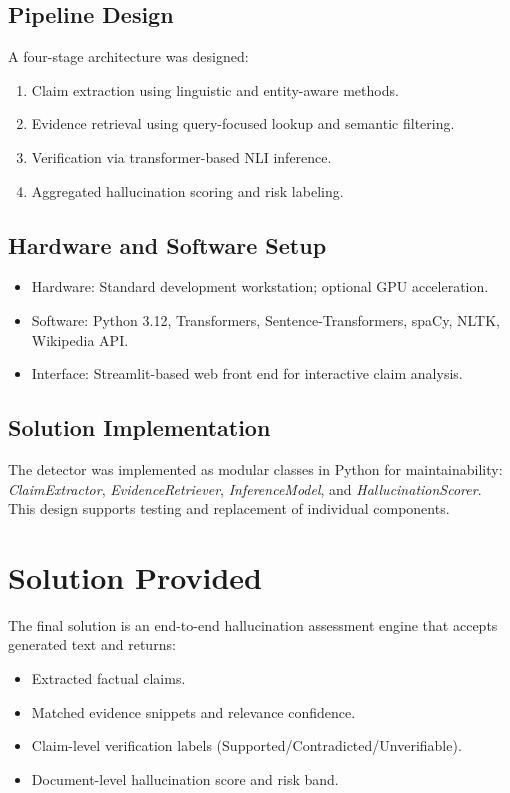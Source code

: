\documentclass[12pt,a4paper]{report}
\begin{document}
\subsection{Pipeline Design}
A four-stage architecture was designed:
\begin{enumerate}[leftmargin=1.5em]
\item Claim extraction using linguistic and entity-aware methods.
\item Evidence retrieval using query-focused lookup and semantic filtering.
\item Verification via transformer-based NLI inference.
\item Aggregated hallucination scoring and risk labeling.
\end{enumerate}

\subsection{Hardware and Software Setup}
\begin{itemize}[leftmargin=1.5em]
\item Hardware: Standard development workstation; optional GPU acceleration.
\item Software: Python 3.12, Transformers, Sentence-Transformers, spaCy, NLTK, Wikipedia API.
\item Interface: Streamlit-based web front end for interactive claim analysis.
\end{itemize}

\subsection{Solution Implementation}
The detector was implemented as modular classes in Python for maintainability:
\textit{ClaimExtractor}, \textit{EvidenceRetriever}, \textit{InferenceModel}, and \textit{HallucinationScorer}.
This design supports testing and replacement of individual components.

\section{Solution Provided}
The final solution is an end-to-end hallucination assessment engine that accepts generated text and returns:
\begin{itemize}[leftmargin=1.5em]
\item Extracted factual claims.
\item Matched evidence snippets and relevance confidence.
\item Claim-level verification labels (Supported/Contradicted/Unverifiable).
\item Document-level hallucination score and risk band.
\end{itemize}
\end{document}

